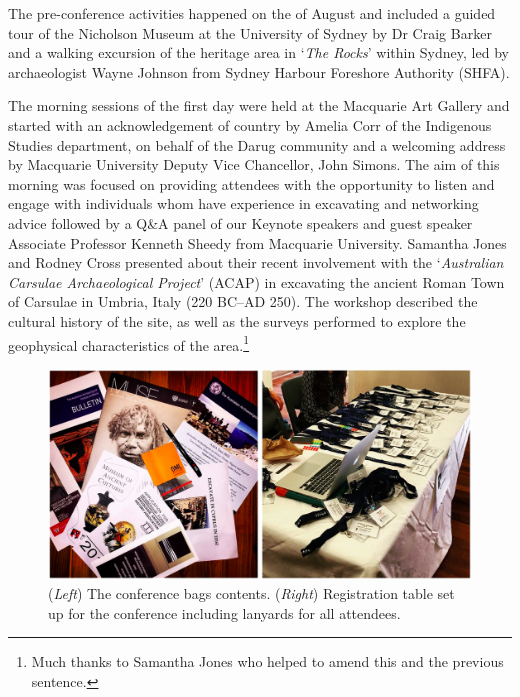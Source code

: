 The pre-conference activities happened on the  of August and included a guided tour of the Nicholson Museum at the University of Sydney by Dr Craig Barker and a walking excursion of the heritage area in ‘\textit{The Rocks}’ within Sydney, led by archaeologist Wayne Johnson from Sydney Harbour Foreshore Authority (SHFA). 

The morning sessions of the first day were held at the Macquarie Art Gallery and started with an acknowledgement of country by Amelia Corr of the Indigenous Studies department, on behalf of the Darug community and a welcoming address by Macquarie University Deputy Vice Chancellor, John Simons. The aim of this morning was focused on providing attendees with the opportunity to listen and engage with individuals whom have experience in excavating and networking advice followed by a Q\&A panel of our Keynote speakers and guest speaker Associate Professor Kenneth Sheedy from Macquarie University. Samantha Jones and Rodney Cross presented about their recent involvement with the ‘\textit{Australian Carsulae Archaeological Project}’ (ACAP) in excavating the ancient Roman Town of Carsulae in Umbria, Italy (220 BC–AD 250). The workshop described the cultural history of the site, as well as the surveys performed to explore the geophysical characteristics of the area.\footnote{Much thanks to Samantha Jones who helped to amend this and the previous sentence.}

\begin{figure}
	\includegraphics[width=\linewidth]{figures/NASC_Fig2}
	\centering
	\caption{(\textit{Left}) The conference bags contents. (\textit{Right}) Registration table set up for the conference including lanyards for all attendees.}
	\label{fig:NASC_Fig2}
\end{figure}

